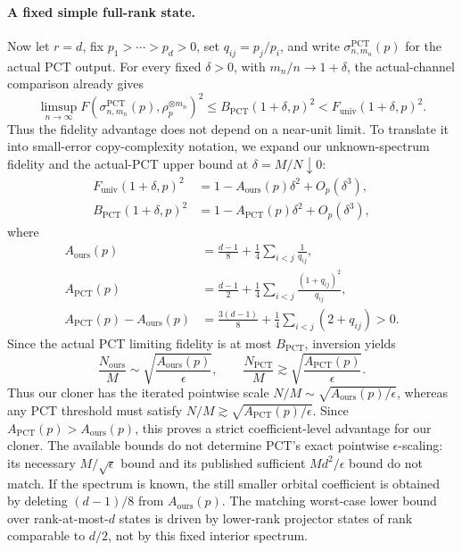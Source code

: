 \documentclass[11pt]{article}
\theoremstyle{remark}
\theoremstyle{plain}
\newcommand{\ot}{\otimes}
\newcommand{\Funiv}{F_{\mathrm{univ}}}
\begin{document}
\paragraph{A fixed simple full-rank state.}
Now let \(r=d\), fix
\(p_1>\cdots>p_d>0\), set \(q_{ij}=p_j/p_i\), and write
\(\sigma_{n,m_n}^{\mathrm{PCT}}(p)\) for the actual PCT output.  For every
fixed \(\delta>0\), with \(m_n/n\to1+\delta\), the actual-channel comparison
already gives
\[
  \limsup_{n\to\infty}
  F\!\left(\sigma_{n,m_n}^{\mathrm{PCT}}(p),
            \rho_p^{\ot m_n}\right)^2
  \le B_{\mathrm{PCT}}(1+\delta,p)^2
  <\Funiv(1+\delta,p)^2.
\]
Thus the fidelity advantage does not depend on a near-unit limit.  To
translate it into small-error copy-complexity notation, we expand our
unknown-spectrum fidelity and the actual-PCT upper bound at
\(\delta=M/N\downarrow0\):
\begin{align*}
  \Funiv(1+\delta,p)^2
  &=1-A_{\mathrm{ours}}(p)\delta^2+O_p(\delta^3),\\
  B_{\mathrm{PCT}}(1+\delta,p)^2
  &=1-A_{\mathrm{PCT}}(p)\delta^2+O_p(\delta^3),
\end{align*}
where
\begin{align*}
  A_{\mathrm{ours}}(p)
  &=\frac{d-1}{8}+\frac14\sum_{i<j}\frac{1}{q_{ij}},\\
  A_{\mathrm{PCT}}(p)
  &=\frac{d-1}{2}
    +\frac14\sum_{i<j}\frac{(1+q_{ij})^2}{q_{ij}},\\
  A_{\mathrm{PCT}}(p)-A_{\mathrm{ours}}(p)
  &=\frac{3(d-1)}{8}+\frac14\sum_{i<j}(2+q_{ij})>0.
\end{align*}
Since the actual PCT limiting fidelity is at most
\(B_{\mathrm{PCT}}\), inversion yields
\[
  \frac{N_{\mathrm{ours}}}{M}
  \sim\sqrt{\frac{A_{\mathrm{ours}}(p)}{\epsilon}},
  \qquad
  \frac{N_{\mathrm{PCT}}}{M}
  \gtrsim\sqrt{\frac{A_{\mathrm{PCT}}(p)}{\epsilon}}.
\]
Thus our cloner has the iterated pointwise scale
\(N/M\sim\sqrt{A_{\mathrm{ours}}(p)/\epsilon}\), whereas any PCT threshold
must satisfy \(N/M\gtrsim\sqrt{A_{\mathrm{PCT}}(p)/\epsilon}\).  Since
\(A_{\mathrm{PCT}}(p)>A_{\mathrm{ours}}(p)\), this proves a strict
coefficient-level advantage for our cloner.  The available bounds do not
determine PCT's exact pointwise \(\epsilon\)-scaling: its necessary
\(M/\sqrt\epsilon\) bound and its published sufficient
\(Md^2/\epsilon\) bound do not match.  If the spectrum is known, the still
smaller orbital coefficient is obtained by deleting \((d-1)/8\) from
\(A_{\mathrm{ours}}(p)\).  The matching worst-case lower bound over
rank-at-most-\(d\) states is driven by lower-rank projector states of rank
comparable to \(d/2\), not by this fixed interior spectrum.
\end{document}
